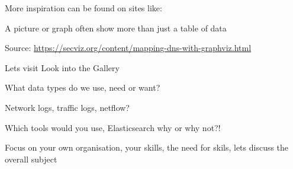 \documentclass[Screen16to9,17pt]{foils}
\begin{document}
More inspiration can be found on sites like:

A picture or graph often show more than just a table of data



Source: \url{https://secviz.org/content/mapping-dns-with-graphviz.html}

\begin{list2}
\item Lets visit  Look into the Gallery
\end{list2}


What data types do we use, need or want?
\begin{list2}
\item Network logs, traffic logs, netflow?
\item Which tools would you use, Elasticsearch why or why not?!
\end{list2}

Focus on your own organisation, your skills, the need for skils, lets discuss the overall subject




\slidenext
\end{document}
